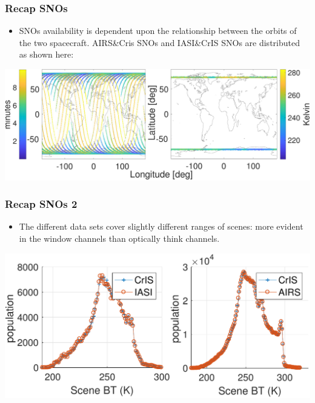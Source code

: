 \documentclass[10pt,t]{beamer}
\begin{document}
\begin{frame}
  \frametitle{Recap SNOs}
  \begin{itemize}
  \item SNOs availability is dependent upon the relationship between the orbits of the two spacecraft. AIRS\&Cris SNOs and IASI\&CrIS SNOs are distributed as shown here:
  \end{itemize}

  \begin{center}
  \includegraphics[width=\linewidth]{./Figs/Pdf/fig3_resize.pdf}
  \end{center}

\end{frame}

\begin{frame}
  \frametitle{Recap SNOs 2}
  \begin{itemize}
  \item The different data sets cover slightly different ranges of scenes: more evident in the window channels than optically think channels.
  \end{itemize}

  \begin{center}
    \includegraphics[width=\linewidth]{./Figs/Pdf/fig4_resize.pdf}
  \end{center}

\end{frame}

\end{document}
